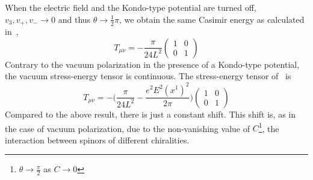\\\\
When the electric field and the Kondo-type potential are turned off, \ie $v_3, v_+, v_- \rightarrow 0$ and thus $\theta \rightarrow \frac 1 2 \pi$,
we obtain the same Casimir energy as calculated in~\cite{Sundberg2003}, \ie
\begin{equation*}
T_{\mu\nu} = -\frac{\pi}{24L^2}\begin{pmatrix} 1 & 0 \\ 0 & 1\end{pmatrix}
\end{equation*}
%
Contrary to the vacuum polarization in the presence of a Kondo-type potential, 
the vacuum stress-energy tensor is continuous.
The stress-energy tensor of~\cite{Zahn2015} is
\begin{equation*}
T_{\mu\nu} = - \big( \frac{\pi}{24L^2} - \frac{e^2 E^2 (x^1)^2}{2\pi}\big) \begin{pmatrix} 1 & 0 \\ 0 & 1 \end{pmatrix}
\end{equation*}
Compared to the above result, there is just a constant shift.
This shift is, as in the case of vacuum polarization, due to the non-vanishing value of $C$\footnote{
$\theta\rightarrow \frac \pi 2$ as $C\rightarrow 0$
}, 
\ie the interaction between spinors of different chiralities.
